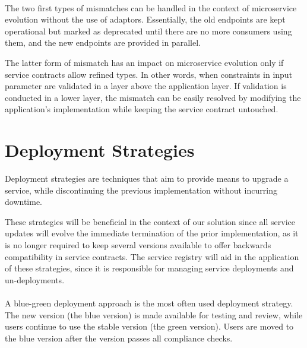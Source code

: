 \paragraph{}

The two first types of mismatches can be handled in the context of microservice evolution without the use of adaptors.
Essentially, the old endpoints are kept operational but marked as deprecated until there are no more consumers using them, and the new endpoints are provided in parallel.

The latter form of mismatch has an impact on microservice evolution only if service contracts allow refined types.
In other words, when constraints in input parameter are validated in a layer above the application layer.
If validation is conducted in a lower layer, the mismatch can be easily resolved by modifying the application's implementation while keeping the service contract untouched.

\section{Deployment Strategies} %
\label{sec:deployment_strategies}

Deployment strategies are techniques that aim to provide means to upgrade a service,
while discontinuing the previous implementation without incurring downtime.

These strategies will be beneficial in the context of our solution since all service updates will evolve the immediate termination of the prior implementation,
as it is no longer required to keep several versions available to offer backwards compatibility in service contracts.
The service registry will aid in the application of these strategies, since it is responsible for managing service deployments and un-deployments.

\paragraph{}

A blue-green deployment approach is the most often used deployment strategy.
The new version (the blue version) is made available for testing and review, while users continue to use the stable version (the green version).
Users are moved to the blue version after the version passes all compliance checks.

\paragraph{}

